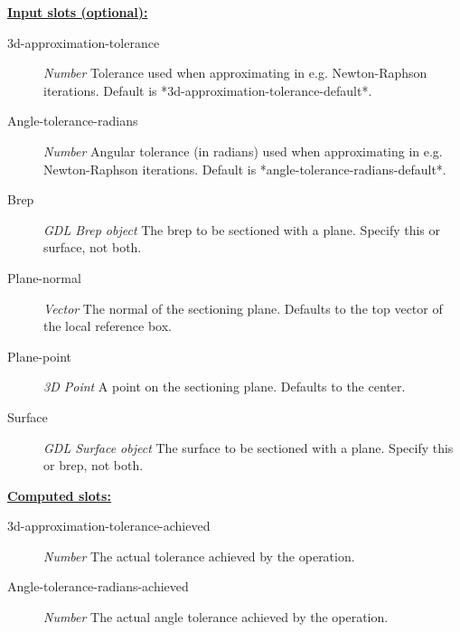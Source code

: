 \documentclass [11pt]{book}
\begin{document}
\begin{itemize}
\textbf{
\underline{Input slots (optional):}}

\begin{description}

\item [3d-approximation-tolerance]
\emph{Number} Tolerance used when approximating in e.g. Newton-Raphson iterations.
Default is *3d-approximation-tolerance-default*.


\item [Angle-tolerance-radians]
\emph{Number} Angular tolerance (in radians) used when approximating in e.g. Newton-Raphson iterations.
Default is *angle-tolerance-radians-default*.


\item [Brep]
\emph{GDL Brep object} The brep to be sectioned with a plane. Specify this or surface, not both.


\item [Plane-normal]
\emph{Vector} The normal of the sectioning plane. Defaults to the top vector of the local reference box.


\item [Plane-point]
\emph{3D Point} A point on the sectioning plane. Defaults to the center.


\item [Surface]
\emph{GDL Surface object} The surface to be sectioned with a plane. Specify this or brep, not both.


\end{description}






\textbf{
\underline{Computed slots:}}

\begin{description}

\item [3d-approximation-tolerance-achieved]
\emph{Number} The actual tolerance achieved by the operation.


\item [Angle-tolerance-radians-achieved]
\emph{Number} The actual angle tolerance achieved by the operation.



\end{description}
\end{itemize}
\end{document}
